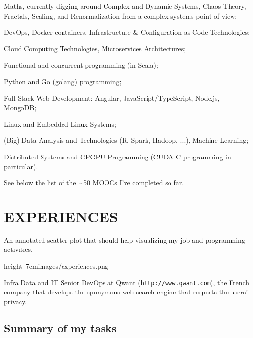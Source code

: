 \bgroup
\item{\bdot}
    Maths, currently digging around Complex and Dynamic Systems, Chaos Theory,
    Fractals, Scaling, and Renormalization from a complex systems point of view;
\item{\bdot}
    DevOps, Docker containers, Infrastructure \& Configuration as Code Technologies;
\item{\bdot}
    Cloud Computing Technologies, Microservices Architectures;
\item{\bdot}
    Functional and concurrent programming (in Scala);
\item{\bdot}
    Python and Go (golang) programming;
\item{\bdot}
    Full Stack Web Development: Angular, JavaScript/TypeScript, Node.js, MongoDB;
\item{\bdot}
    Linux and Embedded Linux Systems;
\item{\bdot}
    (Big) Data Analysis and Technologies (R, Spark, Hadoop, ...), Machine Learning;
\item{\bdot}
    Distributed Systems and GPGPU Programming
    (CUDA C\plusplus{} programming in particular).
\egroup

\smallskip\nobreak\noindent
See below the list of the $\sim$50 MOOCs I've completed so far.
\vfill\eject


\section{EXPERIENCES}

An annotated scatter plot that should help visualizing my job and programming activities.

\bigskip
\centerline{%
    \hbox{\pdfximage height 7cm{images/experiences.png}\pdfrefximage\pdflastximage}}
\smallskip



Infra Data and IT Senior DevOps at Qwant ({\tt http://www.qwant.com}), the
French company that develops the eponymous web search engine that respects the
users' privacy.

\subsection{Summary of my tasks}

